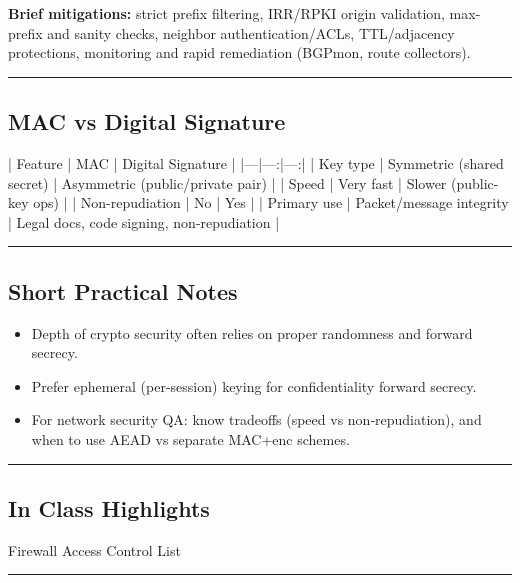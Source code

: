 \documentclass{article}
\begin{document}
\textbf{Brief mitigations:} strict prefix filtering, IRR/RPKI origin validation, max-prefix and sanity checks, neighbor authentication/ACLs, TTL/adjacency protections, monitoring and rapid remediation (BGPmon, route collectors).

\hrule

\subsection{MAC vs Digital Signature}
| Feature | MAC | Digital Signature |
|---|---:|---:|
| Key type | Symmetric (shared secret) | Asymmetric (public/private pair) |
| Speed | Very fast | Slower (public-key ops) |
| Non-repudiation | No | Yes |
| Primary use | Packet/message integrity | Legal docs, code signing, non‑repudiation |

\hrule

\subsection{Short Practical Notes}
\begin{itemize}
  \item Depth of crypto security often relies on proper randomness and forward secrecy.
  \item Prefer ephemeral (per-session) keying for confidentiality forward secrecy.
  \item For network security QA: know tradeoffs (speed vs non‑repudiation), and when to use AEAD vs separate MAC+enc schemes.
\end{itemize}

\hrule

\subsection{In Class Highlights}
Firewall Access Control List

\hrule
\end{document}
